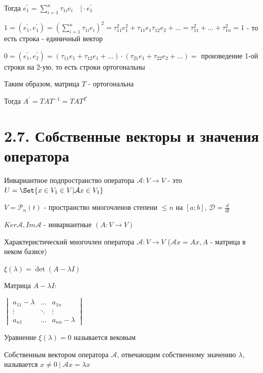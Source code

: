 \documentclass[12pt]{article}
\begin{document}
    Тогда $e_1^\prime = \sum_{i=1}^n \tau_{1i} e_i \quad \Big| \cdot e_1^\prime$

    $1 = (e_1^\prime, e_1^\prime) = (\sum_{i=1}^n \tau_{1i} e_i)^2 =
    \tau^2_{11} e^2_1 + \tau_{11} e_1 \tau_{12} e_2 + \dots = \tau_{11}^2 + \dots + \tau_{1n}^2 = 1$ - то есть строка - единичный вектор

    $0 = (e_1^\prime, e_2^\prime) = (\tau_{11} e_1 + \tau_{12}e_1 + \dots) \cdot
    (\tau_{21}e_1 + \tau_{22}e_2 + \dots) = $ произведение 1-ой строки на 2-ую, то есть строки ортогональны

    Таким образом, матрица $T$ - ортогональна

    \Nota Тогда $A^\prime = T A T^{-1} = T A T^T$

    \section{2.7. Собственные векторы и значения оператора}

    \Def Инвариантное подпространство оператора $\mathcal{A} : V \rightarrow V$ -
    это $U = \Set{x \in V_1 \in V | \mathcal{A}x \in V_1}$

    \Ex $V = \mathcal{P}_n(t)$ - пространство многочленов степени $\leq n$ на $[a; b]$, $\mathcal{D} = \frac{d}{dt}$

    \Nota $Ker \mathcal{A}, Im \mathcal{A}$ - инвариантные $(A : V \rightarrow V)$

    \hypertarget{eigenvalue}{}

    \Def Характеристический многочлен оператора $\mathcal{A} : V \rightarrow V$
    ($\mathcal{A}x = Ax, A$ - матрица в неком базисе)

    $\xi(\lambda) = \det(A - \lambda I)$

    \Nota Матрица $A - \lambda I$:

    $\begin{vmatrix}a_{11} - \lambda & \dots & a_{1n} \\ \vdots & \ddots & \vdots \\ a_{n1} & \dots & a_{nn} - \lambda \end{vmatrix}$

    \Nota Уравнение $\xi(\lambda) = 0$ называется вековым

    \hypertarget{eigenvector}{}

    \Def Собственным вектором оператора $\mathcal{A}$, отвечающим собственному значению $\lambda$,
    называется $x \neq 0 \ | \ \mathcal{A}x = \lambda x$
\end{document}
